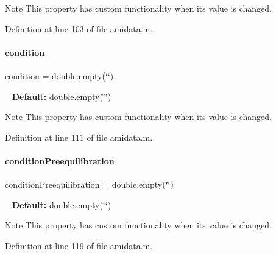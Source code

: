 \begin{DoxyNote}{Note}
This property has custom functionality when its value is changed. 
\end{DoxyNote}


Definition at line 103 of file amidata.\+m.

\mbox{\label{classamidata_a4824b91cc0e6b5f112bdd8049af4d7d6}} 
\paragraph{\texorpdfstring{condition}{condition}}
{\footnotesize\ttfamily condition = double.\+empty(\char`\"{}\char`\"{})}

~\newline
{\bfseries{Default\+:}} double.\+empty(\char`\"{}\char`\"{})

\begin{DoxyNote}{Note}
This property has custom functionality when its value is changed. 
\end{DoxyNote}


Definition at line 111 of file amidata.\+m.

\mbox{\label{classamidata_af7a0dbd9e6e3f3cb15ae008beeaf841a}} 
\paragraph{\texorpdfstring{conditionPreequilibration}{conditionPreequilibration}}
{\footnotesize\ttfamily condition\+Preequilibration = double.\+empty(\char`\"{}\char`\"{})}

~\newline
{\bfseries{Default\+:}} double.\+empty(\char`\"{}\char`\"{})

\begin{DoxyNote}{Note}
This property has custom functionality when its value is changed. 
\end{DoxyNote}


Definition at line 119 of file amidata.\+m.

